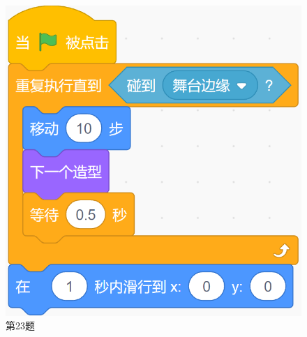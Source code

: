 \documentclass[10pt, a4paper]{article}
\begin{document}
\begin{enumerate}
        \begin{figure}[htbp]
            \centering
            \begin{minipage}[t]{.2\textwidth}
                \centering
                \includegraphics[width=\textwidth]{23.png}
                \caption*{第23题}
            \end{minipage}
            \begin{minipage}[t]{.1\textwidth}
                \centering

\end{minipage}
\end{figure}
\end{enumerate}
\end{document}
